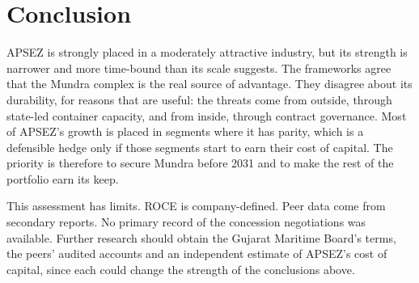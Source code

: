 \documentclass[12pt, a4paper]{article}
\begin{document}
\section{Conclusion}\label{sec:conclusion}
APSEZ is strongly placed in a moderately attractive industry, but its strength
is narrower and more time-bound than its scale suggests. The frameworks agree
that the Mundra complex is the real source of advantage. They disagree about its
durability, for reasons that are useful: the threats come from outside, through
state-led container capacity, and from inside, through contract governance.
Most of APSEZ's growth is placed in segments where it has parity, which is a
defensible hedge only if those segments start to earn their cost of capital.
The priority is therefore to secure Mundra before 2031 and to make the rest of
the portfolio earn its keep.

This assessment has limits. ROCE is company-defined. Peer data come from
secondary reports. No primary record of the concession negotiations was
available. Further research should obtain the Gujarat Maritime Board's terms,
the peers' audited accounts and an independent estimate of APSEZ's cost of
capital, since each could change the strength of the conclusions above.

\clearpage
{}
\end{document}
